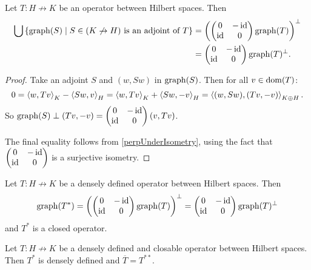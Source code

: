 \begin{proposition}
Let $T: H\not\to K$ be an operator between Hilbert spaces. Then
\begin{align*}
\bigcup\left\{ \operatorname{graph}(S) \;\middle|\; \text{$S\in (K\not\to H)$ is an adjoint of $T$} \right\} &= \left( \begin{pmatrix}
0 & -\operatorname{id} \\ \operatorname{id} & 0
\end{pmatrix}\operatorname{graph}(T) \right)^\perp \\
&=  \begin{pmatrix}
0 & -\operatorname{id} \\ \operatorname{id} & 0
\end{pmatrix}\operatorname{graph}(T)^\perp.
\end{align*}
\end{proposition}
\begin{proof}
Take an adjoint $S$ and $(w, Sw)$ in $\operatorname{graph}(S)$. Then for all $v\in\operatorname{dom}(T)$:
\[ 0 = \left\langle w, Tv \right\rangle_K - \left\langle Sw, v \right\rangle_H = \left\langle w, Tv \right\rangle_K + \left\langle Sw, -v \right\rangle_H = \left\langle (w, Sw), (Tv,-v) \right\rangle_{K\oplus H}. \]
So $\operatorname{graph}(S) \perp (Tv,-v) = \begin{pmatrix}
0 & -\operatorname{id} \\ \operatorname{id} & 0
\end{pmatrix} (v,Tv)$.

The final equality follows from \ref{perpUnderIsometry}, using the fact that $\begin{pmatrix}
0 & -\operatorname{id} \\ \operatorname{id} & 0
\end{pmatrix}$ is a surjective isometry.
\end{proof}
\begin{corollary}
Let $T: H\not\to K$ be a densely defined operator between Hilbert spaces. Then
\[ \operatorname{graph}(T^*) = \left( \begin{pmatrix}
0 & -\operatorname{id} \\ \operatorname{id} & 0
\end{pmatrix}\operatorname{graph}(T) \right)^\perp =  \begin{pmatrix}
0 & -\operatorname{id} \\ \operatorname{id} & 0
\end{pmatrix}\operatorname{graph}(T)^\perp \]
and $T^*$ is a closed operator.
\end{corollary}
\begin{corollary}
Let $T: H\not\to K$ be a densely defined and closable operator between Hilbert spaces. Then $T^*$ is densely defined and $\overline{T} = T^{**}$.
\end{corollary}
